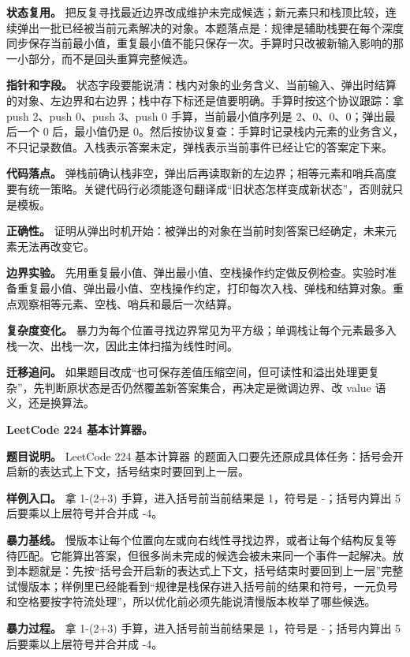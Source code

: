 \textbf{状态复用。} 把反复寻找最近边界改成维护未完成候选；新元素只和栈顶比较，连续弹出一批已经被当前元素解决的对象。本题落点是：规律是辅助栈要在每个深度同步保存当前最小值，重复最小值不能只保存一次。手算时只改被新输入影响的那一小部分，而不是回头重算完整候选。

\textbf{指针和字段。} 状态字段要能说清：栈内对象的业务含义、当前输入、弹出时结算的对象、左边界和右边界；栈中存下标还是值要明确。手算时按这个协议跟踪：拿 push 2、push 0、push 3、push 0 手算，当前最小值序列是 2、0、0、0；弹出最后一个 0 后，最小值仍是 0。然后按协议复查：手算时记录栈内元素的业务含义，不只记录数值。入栈表示答案未定，弹栈表示当前事件已经让它的答案定下来。

\textbf{代码落点。} 弹栈前确认栈非空，弹出后再读取新的左边界；相等元素和哨兵高度要有统一策略。关键代码行必须能逐句翻译成“旧状态怎样变成新状态”，否则就只是模板。

\textbf{正确性。} 证明从弹出时机开始：被弹出的对象在当前时刻答案已经确定，未来元素无法再改变它。

\textbf{边界实验。} 先用重复最小值、弹出最小值、空栈操作约定做反例检查。实验时准备重复最小值、弹出最小值、空栈操作约定，打印每次入栈、弹栈和结算对象。重点观察相等元素、空栈、哨兵和最后一次结算。

\textbf{复杂度变化。} 暴力为每个位置寻找边界常见为平方级；单调栈让每个元素最多入栈一次、出栈一次，因此主体扫描为线性时间。

\textbf{迁移追问。} 如果题目改成“也可保存差值压缩空间，但可读性和溢出处理更复杂”，先判断原状态是否仍然覆盖新答案集合，再决定是微调边界、改 value 语义，还是换算法。

\noindent\textbf{LeetCode 224 基本计算器。}

\textbf{题目说明。} LeetCode 224 基本计算器 的题面入口要先还原成具体任务：括号会开启新的表达式上下文，括号结束时要回到上一层。

\textbf{样例入口。} 拿 1-(2+3) 手算，进入括号前当前结果是 1，符号是 -；括号内算出 5 后要乘以上层符号并合并成 -4。

\textbf{暴力基线。} 慢版本让每个位置向左或向右线性寻找边界，或者让每个结构反复等待匹配。它能算出答案，但很多尚未完成的候选会被未来同一个事件一起解决。放到本题就是：先按“括号会开启新的表达式上下文，括号结束时要回到上一层”完整试慢版本；样例里已经能看到“规律是栈保存进入括号前的结果和符号，一元负号和空格要按字符流处理”，所以优化前必须先能说清慢版本枚举了哪些候选。

\textbf{暴力过程。} 拿 1-(2+3) 手算，进入括号前当前结果是 1，符号是 -；括号内算出 5 后要乘以上层符号并合并成 -4。


